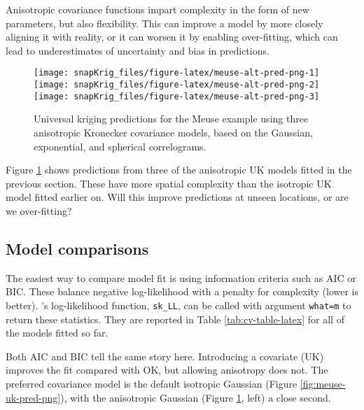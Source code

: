 Anisotropic covariance functions impart complexity in the form of new parameters, but also flexibility. This can improve a model by more closely aligning it with reality, or it can worsen it by enabling over-fitting, which can lead to underestimates of uncertainty and bias in predictions.

\begin{figure}[!bht]
\texttt{[image: snapKrig\_files/figure-latex/meuse-alt-pred-png-1]} \texttt{[image: snapKrig\_files/figure-latex/meuse-alt-pred-png-2]} \texttt{[image: snapKrig\_files/figure-latex/meuse-alt-pred-png-3]} \caption{Universal kriging predictions for the Meuse example using three anisotropic Kronecker covariance models, based on the Gaussian, exponential, and spherical correlograms.}\label{fig:meuse-alt-pred-png}
\end{figure}

Figure \ref{fig:meuse-alt-pred-png} shows predictions from three of the anisotropic UK models fitted in the previous section. These have more spatial complexity than the isotropic UK model fitted earlier on. Will this improve predictions at unseen locations, or are we over-fitting?

\hypertarget{model-comparisons}{%
\subsection{Model comparisons}\label{model-comparisons}}

The easiest way to compare model fit is using information criteria such as AIC or BIC. These balance negative log-likelihood with a penalty for complexity (lower is better). 's log-likelihood function, \texttt{sk\_LL}, can be called with argument \texttt{what=\textquotesingle{}m\textquotesingle{}} to return these statistics. They are reported in Table
\ref{tab:cv-table-latex} for all of the models fitted so far.

Both AIC and BIC tell the same story here. Introducing a covariate (UK) improves the fit compared with OK, but allowing anisotropy does not. The preferred covariance model is the default isotropic Gaussian (Figure \ref{fig:meuse-uk-pred-png}), with the anisotropic Gaussian (Figure \ref{fig:meuse-alt-pred-png}, left) a close second.

